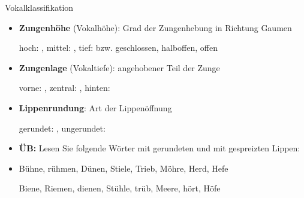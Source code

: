 \begin{frame}{Vokalklassifikation}

	\begin{itemize}
		\item \textbf{Zungenhöhe} (Vokalhöhe): Grad der Zungenhebung in Richtung Gaumen

		\ea hoch: \textipa{[ i: ]}, mittel: \textipa{[ o: ]}, tief: \textipa{[ a: ]} bzw. geschlossen, halboffen, offen
		\z

		\item \textbf{Zungenlage} (Vokaltiefe): angehobener Teil der Zunge

		\ea vorne: \textipa{[ i: ]}, zentral: \textipa{[ a: ]}, hinten: \textipa{[ u: ]}
		\z

		\item \textbf{Lippenrundung}: Art der Lippenöffnung

		\ea gerundet: \textipa{[ o: ]}, ungerundet: \textipa{[ i: ]}
		\z

		\bigskip
                
		\item\textbf{ÜB:} Lesen Sie folgende Wörter mit gerundeten und mit gespreizten Lippen:
		\item[] Bühne, rühmen, Dünen, Stiele, Trieb, Möhre, Herd, Hefe
                  \pause
                  
                        Biene, Riemen, dienen, Stühle, trüb, Meere, hört, Höfe
	\end{itemize}
	
\end{frame}



